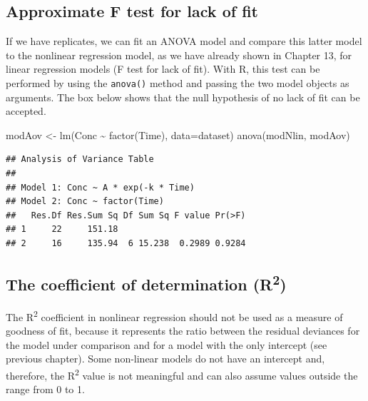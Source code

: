 \documentclass[a4paper,12pt,oneside]{book}
\newenvironment{Shaded}{\begin{snugshade}}{\end{snugshade}}
\newcommand{\SpecialCharTok}[1]{#1}
\newcommand{\OtherTok}[1]{#1}
\newcommand{\FunctionTok}[1]{#1}
\newcommand{\AttributeTok}[1]{#1}
\newcommand{\NormalTok}[1]{#1}
\begin{document}
\hypertarget{approximate-f-test-for-lack-of-fit}{%
\subsection{Approximate F test for lack of fit}\label{approximate-f-test-for-lack-of-fit}}

If we have replicates, we can fit an ANOVA model and compare this latter model to the nonlinear regression model, as we have already shown in Chapter 13, for linear regression models (F test for lack of fit). With R, this test can be performed by using the \texttt{anova()} method and passing the two model objects as arguments. The box below shows that the null hypothesis of no lack of fit can be accepted.

\begin{Shaded}
\begin{Highlighting}[]
\NormalTok{modAov }\OtherTok{\textless{}{-}} \FunctionTok{lm}\NormalTok{(Conc }\SpecialCharTok{\textasciitilde{}} \FunctionTok{factor}\NormalTok{(Time), }\AttributeTok{data=}\NormalTok{dataset)}
\FunctionTok{anova}\NormalTok{(modNlin, modAov)}
\end{Highlighting}
\end{Shaded}

\begin{verbatim}
## Analysis of Variance Table
## 
## Model 1: Conc ~ A * exp(-k * Time)
## Model 2: Conc ~ factor(Time)
##   Res.Df Res.Sum Sq Df Sum Sq F value Pr(>F)
## 1     22     151.18                         
## 2     16     135.94  6 15.238  0.2989 0.9284
\end{verbatim}

\hypertarget{the-coefficient-of-determination-r2}{%
\subsection{\texorpdfstring{The coefficient of determination (R\textsuperscript{2})}{The coefficient of determination (R2)}}\label{the-coefficient-of-determination-r2}}

The R\textsuperscript{2} coefficient in nonlinear regression should not be used as a measure of goodness of fit, because it represents the ratio between the residual deviances for the model under comparison and for a model with the only intercept (see previous chapter). Some non-linear models do not have an intercept and, therefore, the R\textsuperscript{2} value is not meaningful and can also assume values outside the range from 0 to 1.
\end{document}
